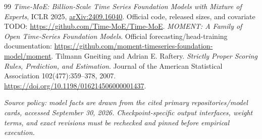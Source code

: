 \documentclass[11pt,letterpaper]{article}
\begin{document}
\begin{thebibliography}{99}
 \emph{Time-MoE: Billion-Scale Time Series Foundation Models with Mixture of Experts}, ICLR 2025, \href{https://arxiv.org/abs/2409.16040}{arXiv:2409.16040}. Official code, released sizes, and covariate TODO: \url{https://github.com/Time-MoE/Time-MoE}.
 \emph{MOMENT: A Family of Open Time-Series Foundation Models}. Official forecasting/head-training documentation: \url{https://github.com/moment-timeseries-foundation-model/moment}.
 Tilmann Gneiting and Adrian E. Raftery. \emph{Strictly Proper Scoring Rules, Prediction, and Estimation}. Journal of the American Statistical Association 102(477):359--378, 2007. \url{https://doi.org/10.1198/016214506000001437}.
\end{thebibliography}
\textit{Source policy: model facts are drawn from the cited primary repositories/model cards, accessed September 30, 2026. Checkpoint-specific output interfaces, weight terms, and exact revisions must be rechecked and pinned before empirical execution.}
\end{document}
